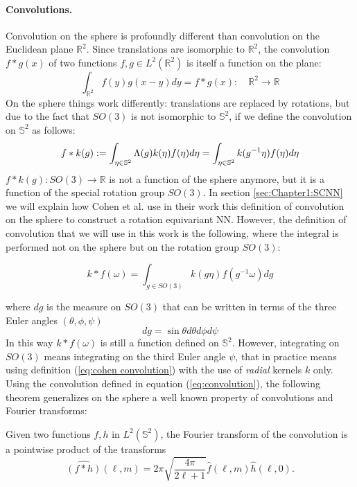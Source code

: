 \paragraph{Convolutions.}
Convolution on the sphere is profoundly different than convolution on the Euclidean plane $\mathbb R^2$. Since translations are isomorphic to $\mathbb R^2$, the convolution $f*g(x)$ of two functions $f, g \in L^2(\mathbb R^2)$ is itself a function on the plane:
\begin{equation}\label{eq:plane convolution}
	 \int_{\mathbb R^2} f(y)g(x-y)dy = f*g(x):\quad \mathbb R^2 \to\mathbb R
\end{equation}
On the sphere things work differently: translations are replaced by rotations, but due to the fact that $SO(3)$ is not isomorphic to $\mathbb S^2$, if we define the convolution on $\mathbb S^2$ as follows:
\begin{equation} \label{eq:cohen convolution}
f* k(g) := \int_{\eta \in \mathbb S^2} \Lambda(g)k( \eta) f(\eta) d\eta=\int_{\eta \in \mathbb S^2} k(g^{-1} \eta) f(\eta) d\eta\\ 
\end{equation}
$f*k(g): SO(3)\to\mathbb R$ is not a function of the sphere anymore, but it is a function of the special rotation group $SO(3)$. In section \ref{sec:Chapter1:SCNN} we will explain how Cohen et al. \cite{SCNN} use in their work this definition of convolution on the sphere to construct a rotation equivariant NN. However, the definition of convolution that we will use in this work is the following, where the integral is performed not on the sphere but on the rotation group $SO(3)$:

\begin{equation}\label{eq:convolution}
 k * f(\omega)=\int_{g \in S O(3)} k(g \eta) f\left(g^{-1} \omega\right) d g 
\end{equation}

where $dg$ is the measure on $SO(3)$ that can be written in terms of the three Euler angles $(\theta, \phi, \psi)$ 
$$dg=\sin\theta d\theta d\phi d\psi$$
In this way $k * f(\omega)$ is still a function defined on $\mathbb S^2$. However, integrating on $SO(3)$ means integrating on the third Euler angle $\psi$, that in practice means using definition (\ref{eq:cohen convolution}) with the use of \textit{radial} kernels $k$ only.
Using the convolution defined in equation (\ref{eq:convolution}), the following theorem \cite{Driscoll:1994:CFT:184069.184073} generalizes on the sphere a well known property of convolutions and Fourier transforms: 
\vspace{0.5cm}
\begin{theorem}\label{theo:convolution}
	Given two functions $f, h$ in $L^2(\mathbb S^2)$, the Fourier transform of the convolution is a pointwise product of the transforms
$$
\hat{(f * h)}(\ell, m)=2 \pi \sqrt{\frac{4 \pi}{2 \ell+1}} \hat{f}(\ell, m) \hat{h}(\ell, 0).
$$
\end{theorem}
\vspace{0.5cm}

